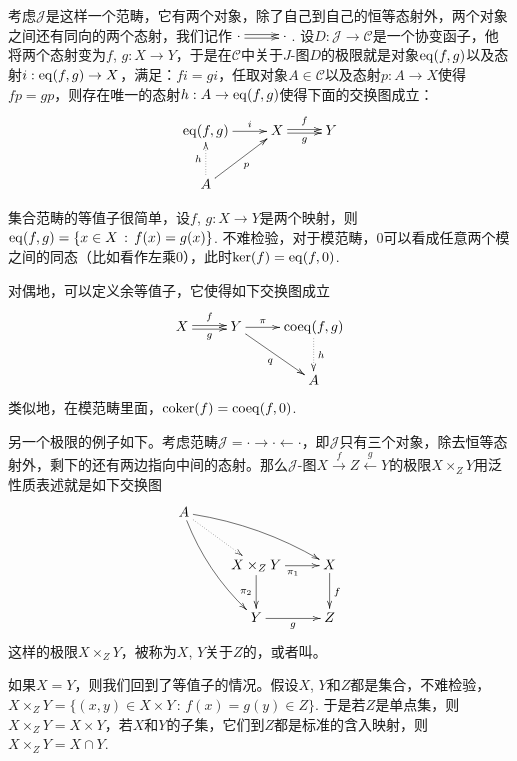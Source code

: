 \begin{para}[等值子与余等值子]
考虑$\mathcal{J}$是这样一个范畴，它有两个对象，除了自己到自己的恒等态射外，两个对象之间还有同向的两个态射，我们记作$\xymatrix{\cdot\ar@<0.3ex>[r] \ar@<-0.3ex>[r]&\cdot}$. 设$D:\mathcal{J}\to\mathcal{C}$是一个协变函子，他将两个态射变为$f$, $g:X\to Y$，于是在$\mathcal{C}$中关于$J$-图$D$的极限就是对象$\operatorname{eq}(f,g)$以及态射$i:\operatorname{eq}(f,g)\to X$，满足：$fi=gi$，任取对象$A\in \mathcal{C}$以及态射$p:A\to X$使得$fp=gp$，则存在唯一的态射$h:A\to \operatorname{eq}(f,g)$使得下面的交换图成立：
\[
\begin{xy}
	\xymatrix{
		\eq(f,g)\ar[r]^-{i}&X\ar@<0.3ex>[r]^-{f} \ar@<-0.3ex>[r]_-{g}&Y\\
		A\ar@{.>}[u]^-{h}\ar[ur]_-{p}
	}
\end{xy}
\]

集合范畴的等值子很简单，设$f$, $g:X\to Y$是两个映射，则$\operatorname{eq}(f,g)=\{x\in X\,:\, f(x)=g(x)\}$. 不难检验，对于模范畴，$0$可以看成任意两个模之间的同态（比如看作左乘$0$），此时$\ker(f)=\operatorname{eq}(f,0)$. 

对偶地，可以定义余等值子，它使得如下交换图成立
\[
\begin{xy}
	\xymatrix{
		X\ar@<0.3ex>[r]^-{f} \ar@<-0.3ex>[r]_-{g}&Y\ar[r]^-{\pi}\ar[dr]_-{q}&\mathrm{coeq}(f,g)\ar@{.>}[d]^-{h}\\
		&&A
	}
\end{xy}
\]
类似地，在模范畴里面，$\operatorname{coker}(f)=\mathrm{coeq}(f,0)$.
\end{para}

\begin{para}[纤维积]
另一个极限的例子如下。考虑范畴$\mathcal{J}=\cdot \to \cdot \leftarrow \cdot$，即$\mathcal{J}$只有三个对象，除去恒等态射外，剩下的还有两边指向中间的态射。那么$\mathcal{J}$-图$X\xrightarrow{f} Z \xleftarrow{g} Y$的极限$X\times_Z Y$用泛性质表述就是如下交换图
\[
\begin{xy}
	\xymatrix{
		A\ar@/_/[rdd]\ar@/^/[drr]\ar@{.>}[dr]&&\\
		&X\times_Z Y\ar[d]_{\pi_2}\ar[r]_{\pi_1}&X\ar[d]^f\\
		&Y\ar[r]_g&Z
	}
\end{xy}
\]
这样的极限$X\times_Z Y$，被称为$X$, $Y$关于$Z$的，或者叫。

如果$X=Y$，则我们回到了等值子的情况。假设$X$, $Y$和$Z$都是集合，不难检验，$X\times_Z Y=\{(x,y)\in X \times Y\,:\,f(x)=g(y)\in Z\}$. 于是若$Z$是单点集，则$X\times_Z Y=X\times Y$，若$X$和$Y$的子集，它们到$Z$都是标准的含入映射，则$X\times_Z Y=X\cap Y$.
\end{para}

